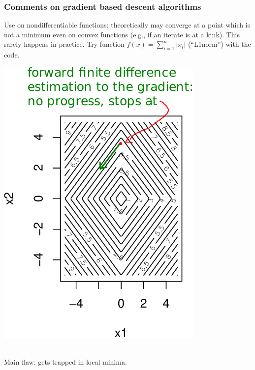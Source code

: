 \documentclass[12pt]{beamer}
\begin{document}
\begin{frame}
\frametitle{Comments on gradient based descent algorithms} 
\begin{minipage}[c]{0.5\textwidth}
Use on nondifferentiable functions: theoretically may converge at a point which is not a minimum even on convex functions (e.g., if an iterate is at a kink). This rarely happens in practice. 
Try function $f(x) = \sum_{i=1}^n \lvert x_i \rvert$ (``L1norm'') with the code. 
\end{minipage}
\begin{minipage}[c]{0.4\textwidth}
\includegraphics[width=\textwidth]{L1norm_contour-premconv-crop.pdf} 
\end{minipage}
\\
Main flaw: gets trapped in local minima.
\end{frame}
\end{document}
